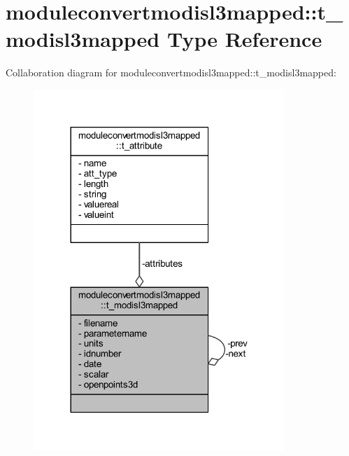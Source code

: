 \hypertarget{structmoduleconvertmodisl3mapped_1_1t__modisl3mapped}{}\section{moduleconvertmodisl3mapped\+:\+:t\+\_\+modisl3mapped Type Reference}
\label{structmoduleconvertmodisl3mapped_1_1t__modisl3mapped}


Collaboration diagram for moduleconvertmodisl3mapped\+:\+:t\+\_\+modisl3mapped\+:\nopagebreak
\begin{figure}[H]
\begin{center}
\leavevmode
\includegraphics[width=269pt]{structmoduleconvertmodisl3mapped_1_1t__modisl3mapped__coll__graph}
\end{center}
\end{figure}
